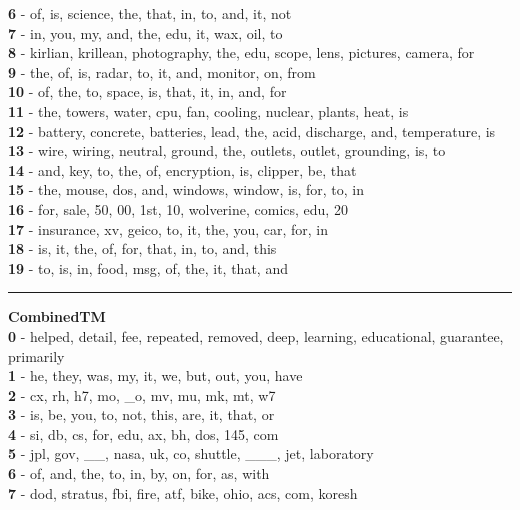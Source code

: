 \textbf{6} - of, is, science, the, that, in, to, and, it, not\\
\textbf{7} - in, you, my, and, the, edu, it, wax, oil, to\\
\textbf{8} - kirlian, krillean, photography, the, edu, scope, lens, pictures, camera, for\\
\textbf{9} - the, of, is, radar, to, it, and, monitor, on, from\\
\textbf{10} - of, the, to, space, is, that, it, in, and, for\\
\textbf{11} - the, towers, water, cpu, fan, cooling, nuclear, plants, heat, is\\
\textbf{12} - battery, concrete, batteries, lead, the, acid, discharge, and, temperature, is\\
\textbf{13} - wire, wiring, neutral, ground, the, outlets, outlet, grounding, is, to\\
\textbf{14} - and, key, to, the, of, encryption, is, clipper, be, that\\
\textbf{15} - the, mouse, dos, and, windows, window, is, for, to, in\\
\textbf{16} - for, sale, 50, 00, 1st, 10, wolverine, comics, edu, 20\\
\textbf{17} - insurance, xv, geico, to, it, the, you, car, for, in\\
\textbf{18} - is, it, the, of, for, that, in, to, and, this\\
\textbf{19} - to, is, in, food, msg, of, the, it, that, and\\
\hrule\vspace{2mm}
\noindent
\textbf{CombinedTM}\vspace{2mm}\\
\vspace{2mm}
\noindent
\textbf{0} - helped, detail, fee, repeated, removed, deep, learning, educational, guarantee, primarily\\
\textbf{1} - he, they, was, my, it, we, but, out, you, have\\
\textbf{2} - cx, rh, h7, mo, \_o, mv, mu, mk, mt, w7\\
\textbf{3} - is, be, you, to, not, this, are, it, that, or\\
\textbf{4} - si, db, cs, for, edu, ax, bh, dos, 145, com\\
\textbf{5} - jpl, gov, \_\_, nasa, uk, co, shuttle, \_\_\_, jet, laboratory\\
\textbf{6} - of, and, the, to, in, by, on, for, as, with\\
\textbf{7} - dod, stratus, fbi, fire, atf, bike, ohio, acs, com, koresh\\
